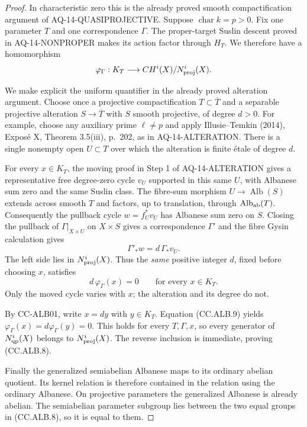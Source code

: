 \begin{proof}
In characteristic zero this is the already proved
smooth compactification argument of
AQ-14-QUASIPROJECTIVE.  Suppose $\operatorname{char}k=p>0$.
Fix one parameter $T$ and one correspondence $\Gamma$.
The proper-target Suslin descent proved in
AQ-14-NONPROPER makes its action factor through
$H_T$.  We therefore have a homomorphism
\[
 \varphi_\Gamma:K_T\longrightarrow
 CH^i(X)/N^i_{\rm proj}(X).
\]

We make explicit the uniform quantifier in the
already proved alteration argument.
Choose once a projective compactification
$T\subset\overline T$ and a separable projective
alteration $S\to\overline T$ with $S$ smooth
projective, of degree $d>0$.
For example, choose any auxiliary prime $\ell\ne p$
and apply Illusie--Temkin (2014), Expos\'e X,
Theorem 3.5(iii), p.~202, as in AQ-14-ALTERATION.
There is a single nonempty open $U\subset T$ over
which the alteration is finite \'{e}tale of degree $d$.

For every $x\in K_T$, the moving proof in Step 1 of
AQ-14-ALTERATION gives a representative free
degree-zero cycle $v_U$ supported in this same $U$,
with Albanese sum zero and the same Suslin class.
The fibre-sum morphism
$U\to\operatorname{Alb}(S)$ extends across smooth
$T$ and factors, up to translation, through
$\operatorname{Alb}_{\rm ab}(T)$.
Consequently the pullback cycle $w=f_U^*v_U$ has
Albanese sum zero on $S$.
Closing the pullback of $\Gamma|_{X\times U}$
on $X\times S$ gives a correspondence $\Gamma'$
and the fibre Gysin calculation gives
\[
 \Gamma'_*w=d\,\Gamma_*v_U.
\]
The left side lies in $N^i_{\rm proj}(X)$.
Thus the \emph{same} positive integer $d$, fixed
before choosing $x$, satisfies
\[
 d\,\varphi_\Gamma(x)=0\qquad\text{for every }x\in K_T.
                                                               \tag{CC.ALB.9}
\]
Only the moved cycle varies with $x$; the alteration
and its degree do not.

By CC-ALB01, write $x=dy$ with $y\in K_T$.
Equation (CC.ALB.9) yields
$\varphi_\Gamma(x)=d\varphi_\Gamma(y)=0$.
This holds for every $T,\Gamma,x$, so every generator
of $N^i_{\rm qp}(X)$ belongs to $N^i_{\rm proj}(X)$.
The reverse inclusion is immediate, proving
(CC.ALB.8).

Finally the generalized semiabelian Albanese maps
to its ordinary abelian quotient.  Its kernel
relation is therefore contained in the relation
using the ordinary Albanese.  On projective
parameters the generalized Albanese is already
abelian.  The semiabelian parameter subgroup lies
between the two equal groups in (CC.ALB.8), so it
is equal to them.
\end{proof}

